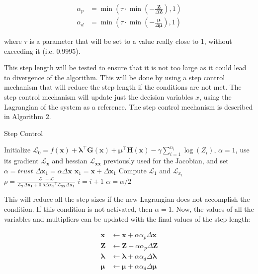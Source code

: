 \begin{equation}
    \begin{split}
    \alpha_p &= \min \left( \tau \cdot \min \left(- \frac{\bm{Z}}{\Delta\bm{Z}}\right), 1 \right) \\
    \alpha_d &= \min \left( \tau \cdot \min \left(- \frac{\bm{\mu}}{\Delta\bm{\mu}}\right), 1 \right)
    \end{split}
    \label{eq:step_length}
\end{equation}

where $\tau$ is a parameter that will be set to a value really close to 1, without exceeding it (i.e. 0.9995). 

This step length will be tested to ensure that it is not too large as it could lead to divergence of the algorithm. This will be done by using a
step control mechanism that will reduce the step length if the conditions are not met. The step control mechanism will update just the decision variables $x$,
using the Lagrangian of the system as a reference. The step control mechanism is described in Algorithm 2.

\begin{algorithm}
    \caption{Step Control}
    \begin{algorithmic}[2]
    \STATE Initialize  $\mathcal{L}_0 = f(\bm{x}) + \bm{\lambda}^\top \bm{G(x)} + \bm{\mu}^\top \bm{H(x)} - \gamma \sum_{i=1}^{n_i} \log(Z_i)$, $\alpha = 1$, use
    its gradient $\bm{\mathcal{L}_x}$ and hessian $\bm{\mathcal{L}_{xx}}$ previously used for the Jacobian, and set $\alpha = trust$
        \STATE $\Delta \bm{x}_1 = \alpha \Delta \bm{x}$
        \STATE $\bm{x}_1 = \bm{x} + \Delta \bm{x}_1$
        \STATE Compute $\mathcal{L}_1$ and $\mathcal{L}_{x_1}$
        \STATE $\rho = \frac{\mathcal{L}_1 - \mathcal{L}}{\bm{\mathcal{L}_x} \Delta \bm{x_1} + 0.5 \Delta \bm{x_1}^\top \bm{\mathcal{L}_{xx}}\Delta \bm{x_1}}$ 
            \STATE $i = i+1$
            \STATE $\alpha = \alpha / 2$
        \ENDIF 
    \ENDWHILE
    \end{algorithmic}
\end{algorithm}

This will reduce all the step sizes if the new Lagrangian does not accomplish the condition. If this condition is not activated, then $\alpha = 1$.
Now, the values of all the variables and multipliers can be updated with the final values of the step length: 

\begin{equation}
    \begin{split}
    \bm{x} &\leftarrow \bm{x} + \alpha\alpha_p \Delta \bm{x} \\
    \bm{Z} &\leftarrow \bm{Z} + \alpha\alpha_p \Delta \bm{Z} \\
    \bm{\lambda} &\leftarrow \bm{\lambda} + \alpha\alpha_d \Delta \bm{\lambda} \\
    \bm{\mu} &\leftarrow \bm{\mu} + \alpha\alpha_d \Delta \bm{\mu}
    \end{split}
    \label{eq:update}
\end{equation}

